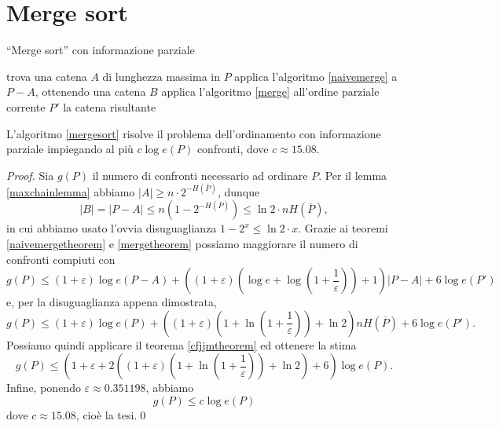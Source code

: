 \section{Merge sort} 
\begin{algorithm}
	\caption{``Merge sort'' con informazione parziale} \label{mergesort} 
	\begin{algorithmic}
		[1] \STATE trova una catena \(A\) di lunghezza massima in \(P\) \STATE applica l'algoritmo \ref{naivemerge} a \(P-A\), ottenendo una catena \(B\) \STATE applica l'algoritmo \ref{merge} all'ordine parziale corrente \(P'\) \RETURN la catena risultante 
	\end{algorithmic}
\end{algorithm}
\begin{theorem}
	\label{mergesorttheorem} L'algoritmo \ref{mergesort} risolve il problema dell'ordinamento con informazione parziale impiegando al più \(c \log{e(P)}\) confronti, dove \(c\approx 15.08\). 
\end{theorem}
\begin{proof}
  Sia \(g(P)\) il numero di confronti necessario ad ordinare \(P\). Per il lemma \ref{maxchainlemma} abbiamo \(|A|\ge n\cdot 2^{-H(\overline{P})}\), dunque
	\[|B|=|P-A|\le n(1-2^{-H(\overline{P})})\le\ln{2}\cdot nH(\overline{P}),\]
	in cui abbiamo usato l'ovvia disuguaglianza \(1-2^{x}\le\ln{2}\cdot x\). Grazie ai teoremi \ref{naivemergetheorem} e \ref{mergetheorem} possiamo maggiorare il numero di confronti compiuti con
	\[g(P)\le(1+\varepsilon)\log{e(P-A)}+\left((1+\varepsilon)\left(\log{e}+\log{\left(1+\frac{1}{\varepsilon}\right)}\right)+1\right)|P-A|+6\log{e(P')}\]
	e, per la disuguaglianza appena dimostrata,
	\[ g(P)\le(1+\varepsilon)\log{e(P)}+\left((1+\varepsilon)\left(1+\ln{\left(1+\frac{1}{\varepsilon}\right)}\right)+\ln{2}\right)nH(\overline{P})+6\log{e(P')}.\]
	Possiamo quindi applicare il teorema \ref{cfjjmtheorem} ed ottenere la stima
	\[g(P)\le\left(1+\varepsilon+2\left((1+\varepsilon)\left(1+\ln{\left(1+\frac{1}{\varepsilon}\right)}\right)+\ln{2}\right)+6\right)\log{e(P)}.\]
	Infine, ponendo \(\varepsilon\approx 0.351198\), abbiamo
	\[g(P)\le c\log{e(P)}\nonumber\]
  dove \(c\approx 15.08\), cioè la tesi.\qed
\end{proof}
